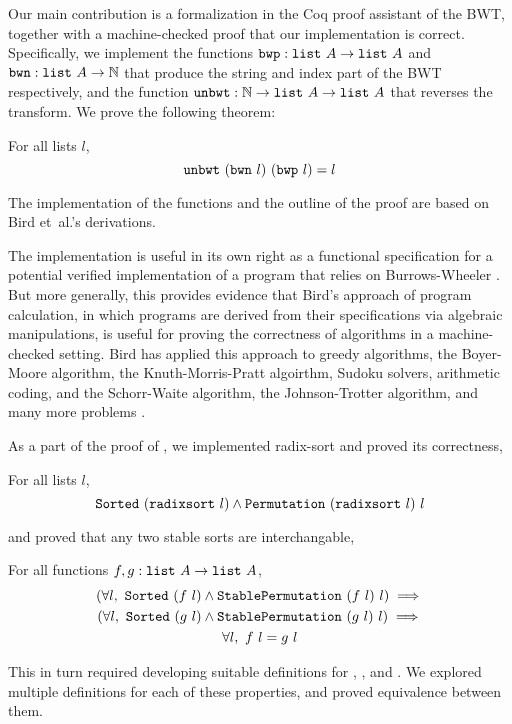 \documentclass[11pt]{thesis}
\begin{document}
Our main contribution is a formalization in the Coq proof assistant of
the BWT, together with a machine-checked proof that our implementation
is correct. Specifically, we implement the functions $\texttt{bwp} :
\texttt{list}~A \to \texttt{list}~A$ and $\texttt{bwn} : \texttt{list}~A
\to \mathbb{N}$ that produce the string and index part of the BWT
respectively, and the function $\texttt{unbwt} : \mathbb{N} \to
\texttt{list}~A \to \texttt{list}~A$ that reverses the transform. We
prove the following theorem:
\begin{theorem}
  \label{thm:unbwt_correct}
  For all lists $l$,
  \begin{equation*}
    \texttt{unbwt}~(\texttt{bwn}~l)~(\texttt{bwp}~l) = l
  \end{equation*}
\end{theorem}
The implementation of the functions and the outline of the proof are
based on Bird et~al.'s derivations.

The implementation is useful in its own right as a functional
specification for a potential verified implementation of a program
that relies on Burrows-Wheeler \cite{appel-func-spec}. But more
generally, this provides evidence that Bird's approach of program
calculation, in which programs are derived from their specifications
via algebraic manipulations, is useful for proving the correctness of
algorithms in a machine-checked setting. Bird has applied this
approach to greedy algorithms, the Boyer-Moore algorithm, the
Knuth-Morris-Pratt algoirthm, Sudoku solvers, arithmetic coding, and
the Schorr-Waite algorithm, the Johnson-Trotter algorithm, and many
more problems \cite{pearls}.

As a part of the proof of , we implemented
radix-sort and proved its correctness,
\begin{theorem}
  \label{thm:radixsort_correct}%
  For all lists $l$,
  \begin{equation*}
    \texttt{Sorted}~(\texttt{radixsort}~l) \land \texttt{Permutation}~(\texttt{radixsort}~l)~l
  \end{equation*}
\end{theorem}
and proved that any two stable sorts are interchangable,
\begin{theorem}
  \label{thm:radixsort_correct}%
  For all functions $f, g : \texttt{list}~A \to \texttt{list}~A$,
  \begin{gather*}
    (\forall l,~\texttt{Sorted}~(f~l) \land \texttt{StablePermutation}~(f~l)~l) \implies \\
    (\forall l,~\texttt{Sorted}~(g~l) \land \texttt{StablePermutation}~(g~l)~l) \implies \\
    \forall l,~f~l = g~l
  \end{gather*}
\end{theorem}
This in turn required developing suitable definitions for
, , and .
We explored multiple definitions for each of these properties, and
proved equivalence between them.
\end{document}
